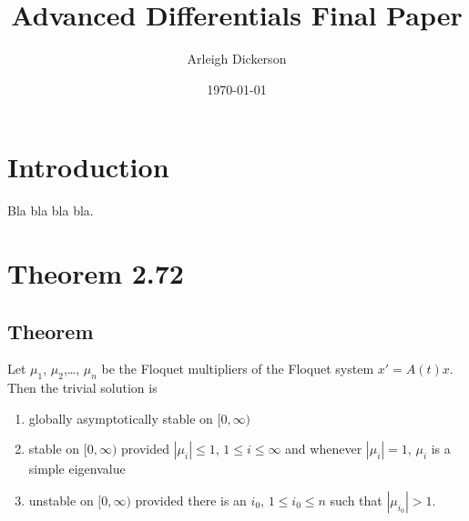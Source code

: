 \documentclass[a4paper]{article}
\title{Advanced Differentials Final Paper}
\author{Arleigh Dickerson}
\date{\today}
\begin{document}
\maketitle

\section{Introduction}

Bla bla bla bla.

\section{Theorem 2.72}

\subsection{Theorem}

Let $\mu_1$, $\mu_2$,\ldots, $\mu_n$ be the Floquet multipliers of the Floquet system $x' = A(t)x$. Then the trivial solution is \begin{enumerate}
    \item globally asymptotically stable on $[0,\infty)$
    \item stable on $[0,\infty)$ provided $|\mu_i| \leq 1$, $1 \leq i \leq \infty$ and whenever $|\mu_i| = 1$, $\mu_i$ is a simple eigenvalue
    \item unstable on $[0,\infty)$ provided there is an $i_0$, $1 \leq i_0 \leq n$ such that $|\mu_{i_0}| > 1$.
\end{enumerate}
\end{document}
